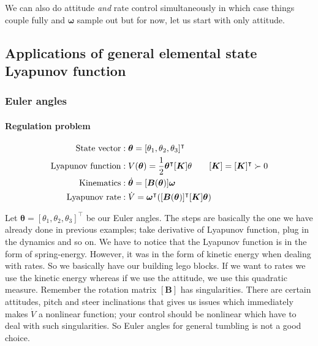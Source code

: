\documentclass{article}
\begin{document}
We can also do attitude \textit{and} rate control simultaneously in which case things couple fully and $\bm{\omega}$ sample out but for now, let us start with only attitude.

\subsection{Applications of general elemental state Lyapunov function}
\subsubsection{Euler angles}

\paragraph{Regulation problem}
\begin{equation*}
  \begin{split}
    \textnormal{State vector}&:\bm{\theta}=[\theta_{1},\theta_{2},\theta_{3}]^{\intercal}\\
    \textnormal{Lyapunov function}&:V(\bm{\theta})=\frac{1}{2}\bm{\theta}^{\intercal}[\bm{K}]\theta\quad\quad[\bm{K}]=[\bm{K}]^{\intercal}\succ0\\
    \textnormal{Kinematics}&:\dot{\bm{\theta}}=[\bm{B}(\bm{\theta})]\bm{\omega}\\
    \textnormal{Lyapunov rate}&:\dot{V}=\bm{\omega}^{\intercal}([\bm{B}(\bm{\theta})]^{\intercal}[\bm{K}]\bm{\theta})\\
  \end{split}
\end{equation*}

Let $\bm{\theta}=[\theta_{1},\theta_{2},\theta_{3}]^{\intercal}$ be our Euler angles. The steps are basically the one we have already done in previous examples; take derivative of Lyapunov function, plug in the dynamics and so on. We have to notice that the Lyapunov function is in the form of spring-energy. However, it was in the form of kinetic energy when dealing with rates. So we basically have our building lego blocks. If we want to rates we use the kinetic energy whereas if we use the attitude, we use this quadratic measure. Remember the rotation matrix $[\bm{B}]$ has singularities. There are certain attitudes, pitch and steer inclinations that gives us issues which immediately makes $\dot{V}$ a nonlinear function; your control should be nonlinear which have to deal with such singularities. So Euler angles for general tumbling is not a good choice.
\end{document}
